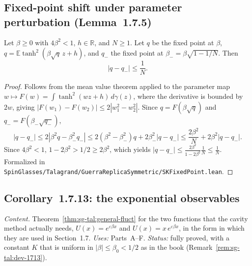 \subsection{Fixed-point shift under parameter perturbation (Lemma~1.7.5)}
\label{sec:sg-tal:fixed-point-shift}

\begin{lemma}
\label{lem:sg-tal:fixed-point-shift}
  \leanok
{}
Let $\beta\ge 0$ with $4\beta^2 < 1$, $h\in\mathbb R$, and $N\ge 1$. Let $q$ be the fixed point at $\beta$,
$q = \mathbb E\tanh^2(\beta\sqrt q\,z + h)$, and $q_-$ the fixed point at $\beta_- = \beta\sqrt{1 - 1/N}$.
Then
\[
|q - q_-| \le \frac{1}{N}.
\]
\end{lemma}
\begin{proof}
  \leanok
Follows from the mean value theorem applied to the parameter map $w \mapsto F(w) = \int \tanh^2(w z + h)\,d\gamma(z)$,
where the derivative is bounded by $2w$, giving $|F(w_1) - F(w_2)| \le 2|w_1^2 - w_2^2|$.
Since $q = F(\beta\sqrt q)$ and $q_- = F(\beta_-\sqrt{q_-})$,
\[
|q - q_-| \le 2|\beta^2 q - \beta_-^2 q_-| \le 2(\beta^2 - \beta_-^2)q + 2\beta_-^2|q - q_-| \le \frac{2\beta^2}{N} + 2\beta^2|q - q_-|.
\]
Since $4\beta^2 < 1$, $1 - 2\beta^2 > 1/2 \ge 2\beta^2$, which yields $|q - q_-| \le \frac{2\beta^2}{1 - 2\beta^2}\frac{1}{N} \le \frac{1}{N}$.
Formalized in \texttt{SpinGlasses/Talagrand/GuerraReplicaSymmetric/SKFixedPoint.lean}.
\end{proof}

\subsection{Corollary~1.7.13: the exponential observables}
\label{sec:sg-tal:fluct-exp}

\emph{Content.}  Theorem~\ref{thm:sg-tal:general-fluct} for the two functions that the cavity method actually needs,
$U(x)=e^{\varepsilon\beta x}$ and $U(x)=x\,e^{\varepsilon\beta x}$, in the form in which they are used in Section~1.7.
\emph{Uses:} Parts~A--F.  \emph{Status:} fully proved, with a constant $K$ that is uniform in $|\beta|\le\beta_0<1/2$ as in the book (Remark~\ref{rem:sg-tal:dev-1713}).

